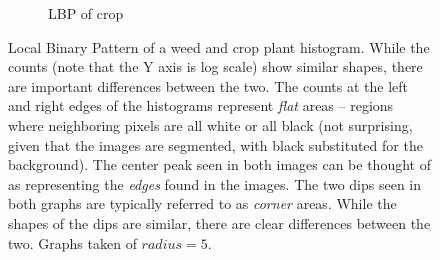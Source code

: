 \documentclass[letterpaper]{article}
\begin{document}
{\begin{figure}[H]
\begin{subfigure}{0.48\linewidth}
		\caption{LBP of crop}
		\label{subfig:lbp-crop}		
	\end{subfigure}%
	\caption[Local Binary Pattern of a weed and crop plant histogram]{Local Binary Pattern of a weed and crop plant histogram. While the counts (note that the Y axis is log scale) show similar shapes, there are important differences between the two. The counts at the left and right edges of the histograms represent \textit{flat} areas -- regions where neighboring pixels are all white or all black (not surprising, given that the images are segmented, with black substituted for the background). The center peak seen in both images can be thought of as representing the \textit{edges} found in the images. The two dips seen in both graphs are typically referred to as \textit{corner} areas. While the shapes of the dips are similar, there are clear differences between the two. Graphs taken of $radius=5$.}
	\label{fig:lbp}
\end{figure}

}
\end{document}
